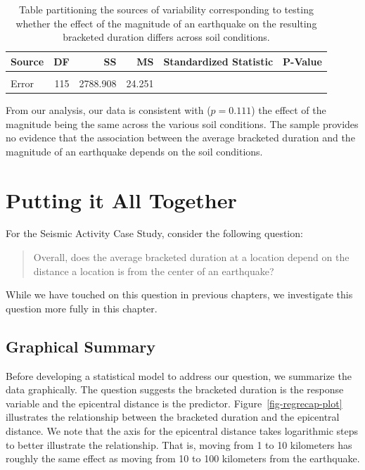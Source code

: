 \documentclass[
  letterpaper,
  DIV=11,
  numbers=noendperiod]{scrreprt}
\theoremstyle{definition}
\theoremstyle{definition}
\theoremstyle{plain}
\theoremstyle{remark}
\begin{document}
\hypertarget{tbl-regextensions-anova}{}
\begin{table}
\caption{\label{tbl-regextensions-anova}Table partitioning the sources of variability corresponding to testing
whether the effect of the magnitude of an earthquake on the resulting
bracketed duration differs across soil conditions. }\tabularnewline

\centering
\begin{tabular}[t]{lrrrrr}
\toprule
Source & DF & SS & MS & Standardized Statistic & P-Value\\
\midrule
\cellcolor{gray!6}{Additional Terms} & \cellcolor{gray!6}{1} & \cellcolor{gray!6}{62.663} & \cellcolor{gray!6}{62.663} & \cellcolor{gray!6}{2.584} & \cellcolor{gray!6}{0.111}\\
Error & 115 & 2788.908 & 24.251 &  & \\
\bottomrule
\end{tabular}
\end{table}

From our analysis, our data is consistent with (\(p = 0.111\)) the
effect of the magnitude being the same across the various soil
conditions. The sample provides no evidence that the association between
the average bracketed duration and the magnitude of an earthquake
depends on the soil conditions.

\hypertarget{sec-regrecap}{%
\chapter{Putting it All Together}\label{sec-regrecap}}

For the Seismic Activity Case Study, consider the following question:

\begin{quote}
Overall, does the average bracketed duration at a location depend on the
distance a location is from the center of an earthquake?
\end{quote}

While we have touched on this question in previous chapters, we
investigate this question more fully in this chapter.

\hypertarget{graphical-summary}{%
\section{Graphical Summary}\label{graphical-summary}}

Before developing a statistical model to address our question, we
summarize the data graphically. The question suggests the bracketed
duration is the response variable and the epicentral distance is the
predictor. Figure~\ref{fig-regrecap-plot} illustrates the relationship
between the bracketed duration and the epicentral distance. We note that
the axis for the epicentral distance takes logarithmic steps to better
illustrate the relationship. That is, moving from 1 to 10 kilometers has
roughly the same effect as moving from 10 to 100 kilometers from the
earthquake.
\end{document}
